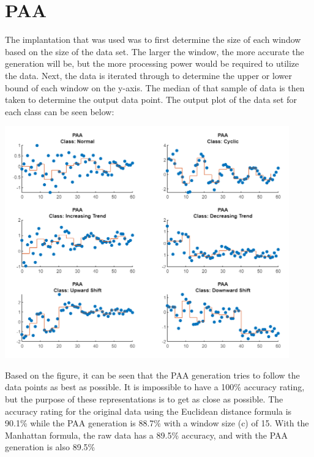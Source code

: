 \documentclass{article}
\begin{document}
\newpage
\section{PAA}
The implantation that was used was to first determine the size of each window
based on the size of the data set.  The larger the window, the more accurate
the generation will be, but the more processing power would be required to 
utilize the data.  Next, the data is iterated through to determine the upper
or lower bound of each window on the y-axis.  The median of that sample of 
data is then taken to determine the output data point.
\newline
\noindent
The output plot of the data set for each class can be seen below:
\begin{center}
{\includegraphics[height=10cm]{graphics/paaplot.png}\centering}
\end{center}

Based on the figure, it can be seen that the PAA generation tries to follow
the data points as best as possible.  It is impossible to have a 100\% accuracy 
rating, but the purpose of these representations is to get as close as possible.
The accuracy rating for the original data using the Euclidean distance formula
is 90.1\% while the PAA generation is 88.7\% with a window size (c) of 15.  With the Manhattan formula, 
the raw data has a 89.5\% accuracy, and with the PAA generation is also
89.5\%
\newline
\end{document}
